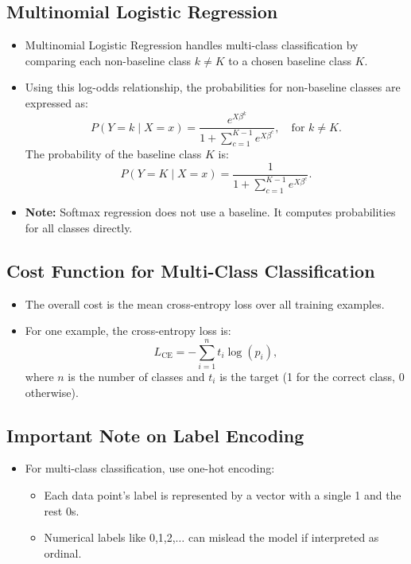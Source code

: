 \documentclass[10pt]{article}
\begin{document}
\subsection{Multinomial Logistic Regression}
\begin{itemize}
    \item Multinomial Logistic Regression handles multi-class classification by comparing each non-baseline class \(k \neq K\) to a chosen baseline class \(K\).
    \item Using this log-odds relationship, the probabilities for non-baseline classes are expressed as:
    \[
    P(Y=k \mid X=x) = \frac{e^{X \beta^k}}{1 + \sum_{c=1}^{K-1} e^{X \beta^c}}, \quad \text{for } k \neq K.
    \]
    The probability of the baseline class \(K\) is:
    \[
    P(Y=K \mid X=x) = \frac{1}{1 + \sum_{c=1}^{K-1} e^{X \beta^c}}.
    \]
    \item \textbf{Note:} Softmax regression does not use a baseline. It computes probabilities for all classes directly.
\end{itemize}

\subsection{Cost Function for Multi-Class Classification}
\begin{itemize}
    \item The overall cost is the mean cross-entropy loss over all training examples.
    \item For one example, the cross-entropy loss is:
    \[
    L_{\mathrm{CE}}=-\sum_{i=1}^{n} t_i \log(p_i),
    \]
    where \(n\) is the number of classes and \(t_i\) is the target (1 for the correct class, 0 otherwise).
\end{itemize}

\subsection{Important Note on Label Encoding}
\begin{itemize}
    \item For multi-class classification, use one-hot encoding:
    \begin{itemize}
        \item Each data point's label is represented by a vector with a single 1 and the rest 0s.
        \item Numerical labels like 0,1,2,\(\ldots\) can mislead the model if interpreted as ordinal.
    \end{itemize}
\end{itemize}
\end{document}
